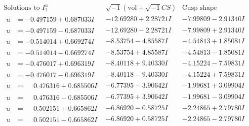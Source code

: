 \documentclass[1p]{elsarticle_modified}
\theoremstyle{definition}
\newcommand{\I}{\sqrt{-1}}
\begin{document}
$$\begin{array}{c|c|c}  
\text{Solutions to }I^u_{1}& \I (\text{vol} + \sqrt{-1}CS) & \text{Cusp shape}\\
 \hline 
\begin{aligned}
u &= -0.497159 + 0.687033 I\end{aligned}
 & -12.69280 + 2.28721 I & -7.99809 - 2.91340 I \\ \hline\begin{aligned}
u &= -0.497159 - 0.687033 I\end{aligned}
 & -12.69280 - 2.28721 I & -7.99809 + 2.91340 I \\ \hline\begin{aligned}
u &= -0.514014 + 0.669274 I\end{aligned}
 & -8.53754 - 4.85587 I & -4.54813 + 1.85081 I \\ \hline\begin{aligned}
u &= -0.514014 - 0.669274 I\end{aligned}
 & -8.53754 + 4.85587 I & -4.54813 - 1.85081 I \\ \hline\begin{aligned}
u &= -0.476017 + 0.696319 I\end{aligned}
 & -8.40118 + 9.40330 I & -4.15224 - 7.59831 I \\ \hline\begin{aligned}
u &= -0.476017 - 0.696319 I\end{aligned}
 & -8.40118 - 9.40330 I & -4.15224 + 7.59831 I \\ \hline\begin{aligned}
u &= \phantom{-}0.476316 + 0.685506 I\end{aligned}
 & -6.77395 - 3.90642 I & -1.99681 + 3.09904 I \\ \hline\begin{aligned}
u &= \phantom{-}0.476316 - 0.685506 I\end{aligned}
 & -6.77395 + 3.90642 I & -1.99681 - 3.09904 I \\ \hline\begin{aligned}
u &= \phantom{-}0.502151 + 0.665862 I\end{aligned}
 & -6.86920 - 0.58725 I & -2.24865 + 2.79780 I \\ \hline\begin{aligned}
u &= \phantom{-}0.502151 - 0.665862 I\end{aligned}
 & -6.86920 + 0.58725 I & -2.24865 - 2.79780 I \\ \hline\begin{aligned}

\end{aligned}
\end{array}$$
\end{document}
